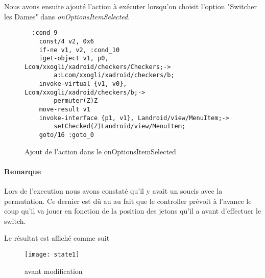 Nous avons ensuite ajouté l'action à exécuter lorsqu'on choisit l'option "Switcher les Dames" dans \textit{onOptionsItemSelected}.

\begin{figure}[!hp]
\begin{verbatim}
  :cond_9
    const/4 v2, 0x6
    if-ne v1, v2, :cond_10
    iget-object v1, p0, Lcom/xxogli/xadroid/checkers/Checkers;->
		a:Lcom/xxogli/xadroid/checkers/b;
    invoke-virtual {v1, v0}, Lcom/xxogli/xadroid/checkers/b;->
		permuter(Z)Z
    move-result v1
    invoke-interface {p1, v1}, Landroid/view/MenuItem;->
		setChecked(Z)Landroid/view/MenuItem;
    goto/16 :goto_0
\end{verbatim}
    \caption{Ajout de l'action dans le onOptionsItemSelected}
\end{figure}

\paragraph{Remarque}
Lors de l'execution nous avons constaté qu'il y avait un soucis avec la permutation.
Ce dernier est dû au au fait que le controller prévoit à l'avance le coup qu'il va jouer en fonction
de la position des jetons qu'il a avant d'effectuer le switch.


Le résultat est affiché comme suit

\begin{figure}[h!]
	      \begin{center}
			\texttt{[image: state1]}
	      \end{center}
	\caption{avant modification}
\end{figure}

